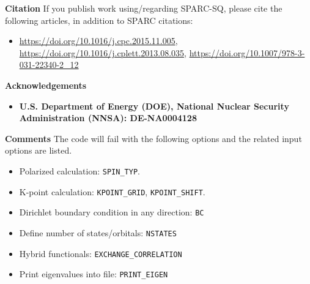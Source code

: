 \begin{frame}[allowframebreaks]{\textbf{Citation}} \label{Citation}
If you publish work using/regarding SPARC-SQ, please cite the following articles, in addition to SPARC citations:
\begin{itemize}
    \item \url{https://doi.org/10.1016/j.cpc.2015.11.005},
     \url{https://doi.org/10.1016/j.cplett.2013.08.035},
    \url{https://doi.org/10.1007/978-3-031-22340-2_12}
\end{itemize}
\end{frame}

\begin{frame}[allowframebreaks]{\textbf{Acknowledgements}} \label{Acknowledgements}
\begin{itemize}
    \item \textbf{U.S. Department of Energy (DOE), National Nuclear Security Administration (NNSA): DE-NA0004128 
        } \\
\end{itemize}
\end{frame}


\begin{frame}[allowframebreaks]{\textbf{Comments}} \label{Introduction}
The code will fail with the following options and the related input options are listed.
\begin{itemize}
  \item Polarized calculation: \texttt{SPIN\_TYP}.
  \item K-point calculation: \texttt{KPOINT\_GRID}, \texttt{KPOINT\_SHIFT}.
  \item Dirichlet boundary condition in any direction: \texttt{BC}
  \item Define number of states/orbitals: \texttt{NSTATES}
  \item Hybrid functionals: \texttt{EXCHANGE\_CORRELATION}
  \item Print eigenvalues into file: \texttt{PRINT\_EIGEN}
\end{itemize}

\end{frame}

